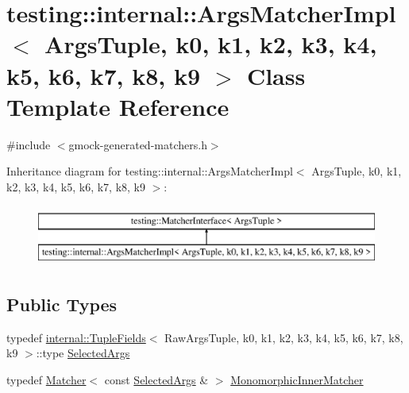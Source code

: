 \hypertarget{classtesting_1_1internal_1_1_args_matcher_impl}{}\section{testing\+::internal\+::Args\+Matcher\+Impl$<$ Args\+Tuple, k0, k1, k2, k3, k4, k5, k6, k7, k8, k9 $>$ Class Template Reference}
\label{classtesting_1_1internal_1_1_args_matcher_impl}


{\ttfamily \#include $<$gmock-\/generated-\/matchers.\+h$>$}

Inheritance diagram for testing\+::internal\+::Args\+Matcher\+Impl$<$ Args\+Tuple, k0, k1, k2, k3, k4, k5, k6, k7, k8, k9 $>$\+:\begin{figure}[H]
\begin{center}
\leavevmode
\includegraphics[height=2.000000cm]{d2/d8f/classtesting_1_1internal_1_1_args_matcher_impl}
\end{center}
\end{figure}
\subsection*{Public Types}
\begin{DoxyCompactItemize}
\item 
typedef \mbox{\hyperlink{classtesting_1_1internal_1_1_tuple_fields}{internal\+::\+Tuple\+Fields}}$<$ Raw\+Args\+Tuple, k0, k1, k2, k3, k4, k5, k6, k7, k8, k9 $>$\+::type \mbox{\hyperlink{classtesting_1_1internal_1_1_args_matcher_impl_ab061679f6251e56ccbedaf0c316d00ff}{Selected\+Args}}
\item 
typedef \mbox{\hyperlink{classtesting_1_1_matcher}{Matcher}}$<$ const \mbox{\hyperlink{classtesting_1_1internal_1_1_args_matcher_impl_ab061679f6251e56ccbedaf0c316d00ff}{Selected\+Args}} \& $>$ \mbox{\hyperlink{classtesting_1_1internal_1_1_args_matcher_impl_ab90d2c074b2072d6c39bf26209fb941f}{Monomorphic\+Inner\+Matcher}}
\end{DoxyCompactItemize}

